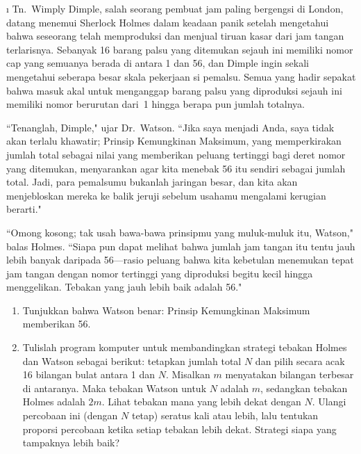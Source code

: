 \begin{LJSItem}
\i\label{exer 3.1.22} Tn.~Wimply Dimple, salah seorang pembuat jam paling bergengsi di
London, datang menemui Sherlock Holmes dalam keadaan panik setelah
mengetahui bahwa seseorang telah memproduksi dan menjual tiruan kasar dari jam tangan
terlarisnya.  Sebanyak 16 barang palsu yang ditemukan sejauh ini
memiliki nomor cap yang semuanya berada di antara 1 dan 56, dan Dimple ingin sekali
mengetahui seberapa besar skala pekerjaan si pemalsu.  Semua yang hadir sepakat bahwa masuk
akal untuk menganggap barang palsu yang diproduksi sejauh ini memiliki nomor berurutan
dari~1 hingga berapa pun jumlah totalnya.
\par
``Tenanglah, Dimple," ujar Dr.\ Watson.  ``Jika saya menjadi Anda, saya tidak akan
terlalu khawatir; Prinsip Kemungkinan Maksimum, yang
memperkirakan jumlah total sebagai nilai yang memberikan peluang tertinggi bagi deret
nomor yang ditemukan, menyarankan agar kita menebak 56 itu sendiri sebagai jumlah total.
Jadi, para pemalsumu bukanlah jaringan besar, dan kita akan menjebloskan mereka ke balik
jeruji sebelum usahamu mengalami kerugian berarti."
\par
``Omong kosong; tak usah bawa-bawa prinsipmu yang muluk-muluk itu, Watson," balas
Holmes.  ``Siapa pun dapat melihat bahwa jumlah jam tangan itu tentu jauh lebih banyak
daripada 56---rasio peluang bahwa kita kebetulan menemukan tepat jam tangan dengan
nomor tertinggi yang diproduksi begitu kecil hingga menggelikan.  Tebakan yang jauh
lebih baik adalah
 56."

\begin{enumerate}
\item Tunjukkan bahwa Watson benar: Prinsip Kemungkinan Maksimum memberikan 56.

\item Tulislah program komputer untuk membandingkan strategi tebakan Holmes dan Watson
sebagai berikut: tetapkan jumlah total $N$ dan pilih secara acak 16 bilangan bulat antara
1 dan $N$.  Misalkan $m$ menyatakan bilangan terbesar di antaranya.  Maka tebakan Watson
untuk $N$ adalah $m$, sedangkan tebakan Holmes adalah $2m$.  Lihat tebakan mana yang lebih
dekat dengan $N$.  Ulangi percobaan ini (dengan $N$ tetap) seratus kali atau lebih, lalu
tentukan proporsi percobaan ketika setiap tebakan lebih dekat.  Strategi siapa yang tampaknya
lebih baik?
\end{enumerate}


\end{LJSItem}
